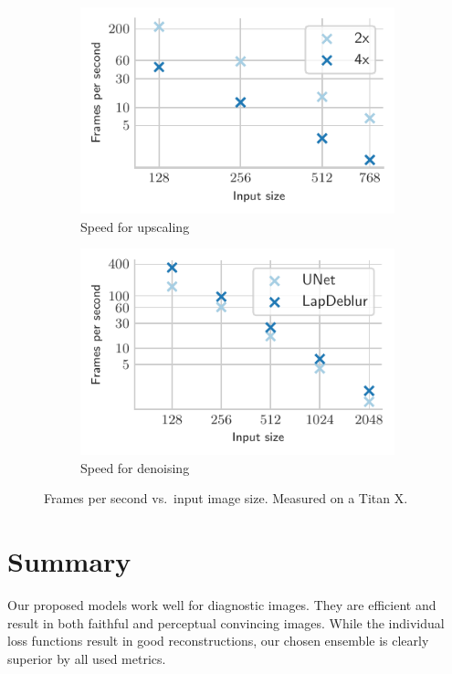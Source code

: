 \documentclass{scrartcl}
\begin{document}
\begin{figure}[htb]
\centering
\begin{subfigure}{0.45\textwidth}
\centering
    \includegraphics[]{time_upscaling_paper}
    \caption{Speed for upscaling}
\end{subfigure}\quad\qquad%
\begin{subfigure}{0.45\textwidth}
\centering
    \includegraphics{time_denoising_paper}
    \caption{Speed for denoising}
\end{subfigure}
\caption{Frames per second vs.\ input image size.
Measured on a Titan X.}
\label{fig:benchmark}
\end{figure}

\section{Summary}
Our proposed models work well for diagnostic images.
They are efficient and result in both faithful and perceptual convincing images.
While the individual loss functions result in good reconstructions, our chosen ensemble is clearly superior by all used metrics.
\end{document}
